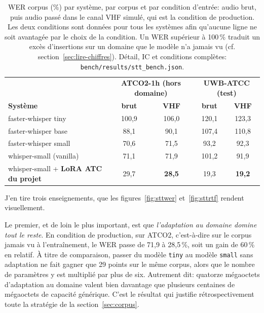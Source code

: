 \documentclass[11pt,a4paper]{article}
\begin{document}
\begin{table}[!htbp]
\centering
\caption[WER corpus (\%) par système, par corpus et par condition d'entrée]{WER corpus (\%) par système, par corpus et par condition d'entrée: audio brut,
puis audio passé dans le canal VHF simulé, qui est la condition de production. Les deux
conditions sont données pour tous les systèmes afin qu'aucune ligne ne soit avantagée par
le choix de la condition. Un WER supérieur à 100\,\% traduit un excès d'insertions sur un
domaine que le modèle n'a jamais vu (cf. section~\ref{sec:lire-chiffres}). Détail, IC et
conditions complètes: \texttt{bench/results/stt\_bench.json}.}
\label{tab:stt}
\small
\setlength{\tabcolsep}{5pt}
\begin{tabular}{lcccc}
\toprule
\rowcolor{lightgray} & \multicolumn{2}{c}{\textbf{ATCO2-1h (hors domaine)}} & \multicolumn{2}{c}{\textbf{UWB-ATCC (test)}}\\
\rowcolor{lightgray}\textbf{Système} & \textbf{brut} & \textbf{VHF} & \textbf{brut} & \textbf{VHF}\\
\midrule
faster-whisper tiny & 100,9 & 106,0 & 120,1 & 123,3\\
faster-whisper base & 88,1 & 90,1 & 107,4 & 110,8\\
faster-whisper small & 70,6 & 71,5 & 93,2 & 92,3\\
whisper-small (vanilla) & 71,1 & 71,9 & 101,2 & 91,9\\
whisper-small + \textbf{LoRA ATC du projet} & 29,7 & \textbf{28,5} & 19,3 & \textbf{19,2}\\
\bottomrule
\end{tabular}
\end{table}

J'en tire trois enseignements, que les figures~\ref{fig:sttwer} et~\ref{fig:sttrtf} rendent visuellement.

Le premier, et de loin le plus important, est que \emph{l'adaptation au domaine domine tout le reste}. En condition de production, sur ATCO2, c'est-à-dire sur le corpus jamais vu à l'entraînement, le WER passe de 71,9 à 28,5\,\%, soit un gain de 60\,\% en relatif. À titre de comparaison, passer du modèle \texttt{tiny} au modèle \texttt{small} sans adaptation ne fait gagner que 29 points sur le même corpus, alors que le nombre de paramètres y est multiplié par plus de six. Autrement dit: quatorze mégaoctets d'adaptation au domaine valent bien davantage que plusieurs centaines de mégaoctets de capacité générique. C'est le résultat qui justifie rétrospectivement toute la stratégie de la section~\ref{sec:corpus}.
\end{document}
